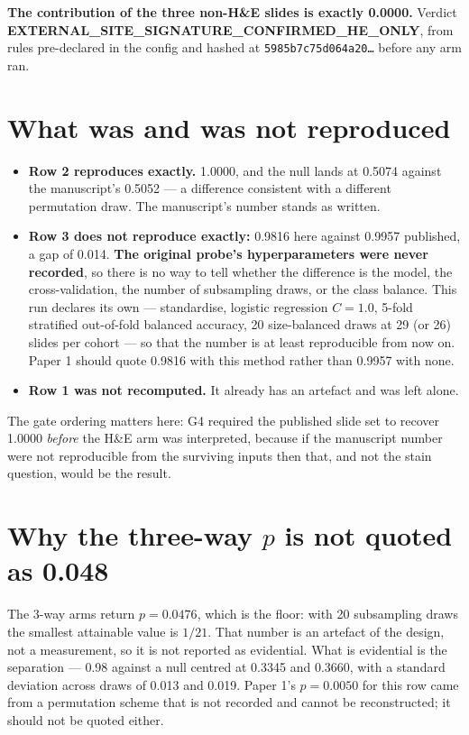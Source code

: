 \documentclass[11pt,a4paper]{article}
\begin{document}
\noindent\textcolor{qgreen}{\textbf{The contribution of the three non-H\&E slides is exactly
0.0000.}} Verdict \textbf{EXTERNAL\_SITE\_SIGNATURE\_CONFIRMED\_HE\_ONLY}, from rules
pre-declared in the config and hashed at \texttt{5985b7c75d064a20\ldots} before any arm ran.

\section{What was and was not reproduced}

\begin{itemize}[leftmargin=1.3em,itemsep=3pt]
\item \textbf{Row 2 reproduces exactly.} 1.0000, and the null lands at 0.5074 against the
      manuscript's 0.5052 --- a difference consistent with a different permutation draw. The
      manuscript's number stands as written.
\item \textbf{Row 3 does not reproduce exactly:} 0.9816 here against 0.9957 published, a gap of
      0.014. \textbf{The original probe's hyperparameters were never recorded}, so there is no way
      to tell whether the difference is the model, the cross-validation, the number of subsampling
      draws, or the class balance. This run declares its own --- standardise, logistic regression
      $C = 1.0$, 5-fold stratified out-of-fold balanced accuracy, 20 size-balanced draws at 29 (or
      26) slides per cohort --- so that the number is at least reproducible from now on. Paper 1
      should quote 0.9816 with this method rather than 0.9957 with none.
\item \textbf{Row 1 was not recomputed.} It already has an artefact and was left alone.
\end{itemize}

The gate ordering matters here: G4 required the published slide set to recover 1.0000 \emph{before}
the H\&E arm was interpreted, because if the manuscript number were not reproducible from the
surviving inputs then that, and not the stain question, would be the result.

\section{Why the three-way $p$ is not quoted as 0.048}

The 3-way arms return $p = 0.0476$, which is the floor: with 20 subsampling draws the smallest
attainable value is $1/21$. That number is an artefact of the design, not a measurement, so it is
not reported as evidential. What is evidential is the separation --- 0.98 against a null centred at
0.3345 and 0.3660, with a standard deviation across draws of 0.013 and 0.019. Paper 1's
$p = 0.0050$ for this row came from a permutation scheme that is not recorded and cannot be
reconstructed; it should not be quoted either.
\end{document}
